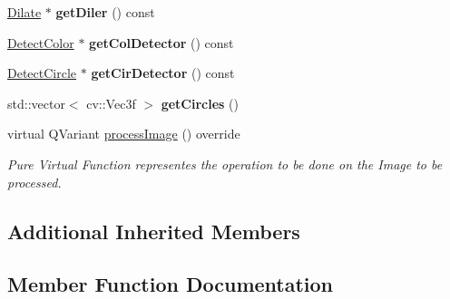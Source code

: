 \begin{DoxyCompactItemize}
\item 
\mbox{\label{class_image_processor_1_1_object_detection_a3b7e2ae3fe985fddad4198046823e13f}} 
\hyperlink{class_image_processor_1_1_dilate}{Dilate} $\ast$ {\bfseries get\+Diler} () const
\item 
\mbox{\label{class_image_processor_1_1_object_detection_a2ac4cebc016409d1dfc26b6109669735}} 
\hyperlink{class_image_processor_1_1_detect_color}{Detect\+Color} $\ast$ {\bfseries get\+Col\+Detector} () const
\item 
\mbox{\label{class_image_processor_1_1_object_detection_a469f3df59addb87b1371c37f81a28a16}} 
\hyperlink{class_image_processor_1_1_detect_circle}{Detect\+Circle} $\ast$ {\bfseries get\+Cir\+Detector} () const
\item 
\mbox{\label{class_image_processor_1_1_object_detection_ae84bd5ac8ccbf2e62b400dd2dbdb2469}} 
std\+::vector$<$ cv\+::\+Vec3f $>$ {\bfseries get\+Circles} ()
\item 
virtual Q\+Variant \hyperlink{class_image_processor_1_1_object_detection_ad8ff5b55d6da63f30dc397082f97370c}{process\+Image} () override
\begin{DoxyCompactList}\small\item\em Pure Virtual Function representes the operation to be done on the Image to be processed. \end{DoxyCompactList}\end{DoxyCompactItemize}
\subsection*{Additional Inherited Members}


\subsection{Member Function Documentation}
\mbox{\label{class_image_processor_1_1_object_detection_ac5561650d95eac1672e2d049ed36201d}} 
